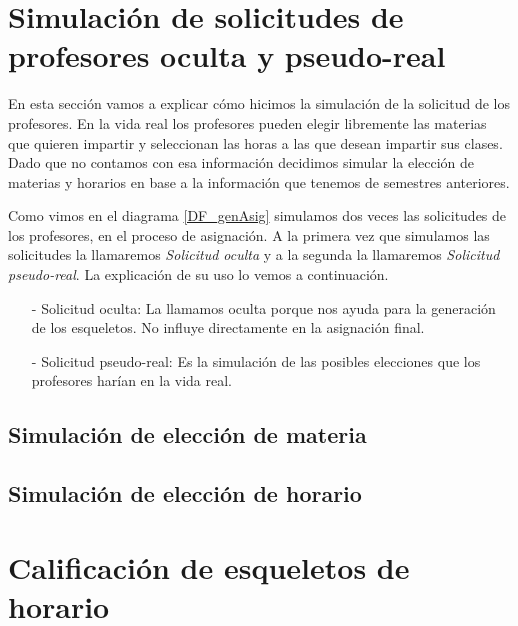 \section{Simulación de solicitudes de profesores oculta y pseudo-real}

En esta sección vamos a explicar cómo hicimos la simulación de la solicitud de los profesores. En la vida real los profesores pueden elegir libremente las materias que quieren impartir y seleccionan las horas a las que desean impartir sus clases. Dado que no contamos con esa información decidimos simular la elección de materias y horarios en base a la información que tenemos de semestres anteriores.

Como vimos en el diagrama \ref{DF_genAsig} simulamos dos veces las solicitudes de los profesores, en el proceso de asignación. A la primera vez que simulamos las solicitudes la llamaremos \textit{Solicitud oculta} y a la segunda la llamaremos \textit{Solicitud pseudo-real}. La explicación de su uso lo vemos a continuación.

\begin{itemize}
\item[-] Solicitud oculta: La llamamos oculta porque nos ayuda para la generación de los esqueletos. No influye directamente en la asignación final.

\item[-] Solicitud pseudo-real: Es la simulación de las posibles elecciones que los profesores harían en la vida real.
\end{itemize}




\subsection{Simulación de elección de materia}

\subsection{Simulación de elección de horario}






\section{Calificación de esqueletos de horario}


